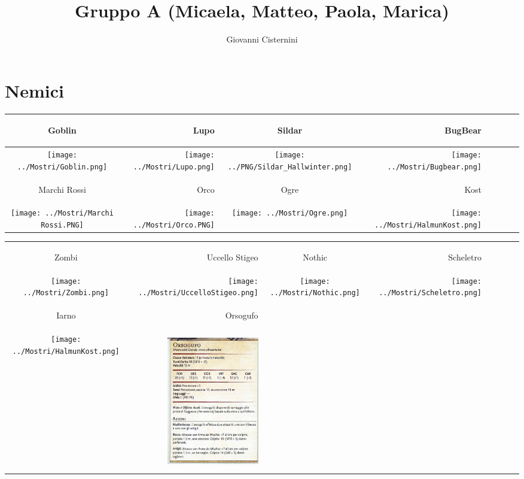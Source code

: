 \documentclass{article}
\title{Gruppo A (Micaela, Matteo, Paola, Marica)}
\author{Giovanni Cisternini}
\begin{document}
\tableofcontents
\newpage
\maketitle


\section{Nemici}
\begin{table}
    \centering
    \begin{tabular}{cr|cr|cr|cr}
         \hypertarget{goblin}{Goblin}& \hypertarget{lupo}{Lupo} &\hypertarget{sildar}{Sildar}&\hypertarget{bugbear}{BugBear}\\
         \hline
           \texttt{[image: ../Mostri/Goblin.png]}  & \texttt{[image: ../Mostri/Lupo.png]} & \texttt{[image: ../PNG/Sildar\_Hallwinter.png]}&
            \texttt{[image: ../Mostri/Bugbear.png]}\\
              \hline
            \hypertarget{marchirossi}{Marchi Rossi} & \hypertarget{orco}{Orco} & \hypertarget{ogre}{Ogre}&\hypertarget{kost}{Kost}\\
            \texttt{[image: ../Mostri/Marchi Rossi.PNG]} &  \texttt{[image: ../Mostri/Orco.PNG]}& \texttt{[image: ../Mostri/Ogre.png]}& \texttt{[image: ../Mostri/HalmunKost.png]} \\
              \hline
          
    \end{tabular}
     
\end{table}

\begin{table}
    \centering
      \begin{tabular}{cr|cr|cr|cr}
            \hypertarget{zombi}{Zombi} & \hypertarget{uccello}{Uccello Stigeo}&  \hypertarget{nothic}{Nothic} & \hypertarget{scheletro}{Scheletro}\\
            \texttt{[image: ../Mostri/Zombi.png]}& \texttt{[image: ../Mostri/UccelloStigeo.png]}& \texttt{[image: ../Mostri/Nothic.png]}&\texttt{[image: ../Mostri/Scheletro.png]}\\
            \hline
              \hypertarget{Iarno}{Iarno} & \hypertarget{Orsogufo}{Orsogufo} \\
              \texttt{[image: ../Mostri/HalmunKost.png]}&\includegraphics[width=4cm,height = 6cm]{../Mostri/Orsogufo.png}\\
            
            
    \end{tabular}
\end{table}
\newpage
\end{document}

